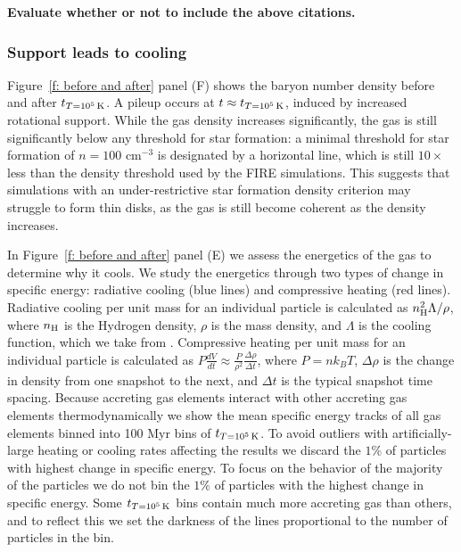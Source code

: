 \documentclass[fleqn,usenatbib]{mnras}
\newcommand{\tcon}{t_{T=10^5\,{\rm K}}}
\newcommand{\nH}{n_{\rm H}}
\begin{document}
\textbf{Evaluate whether or not to include the above citations.}

\subsubsection{Support leads to cooling}
\label{s: mechanics -- energy balance}

Figure~\ref{f: before and after} panel (F) shows the baryon number density before and after $\tcon$.
A pileup occurs at $t\approx \tcon$, induced by increased rotational support.
While the gas density increases significantly, the gas is still significantly below any threshold for star formation:
a minimal threshold for star formation of $n = 100$ cm$^{-3}$ is designated by a horizontal line, which is still $10\times$ less than the density threshold used by the FIRE simulations.
This suggests that simulations with an under-restrictive star formation density criterion may struggle to form thin disks, as the gas is still become coherent as the density increases.

In Figure~\ref{f: before and after} panel (E) we assess the energetics of the gas to determine why it cools.
We study the energetics through two types of change in specific energy: radiative cooling (blue lines) and compressive heating (red lines).
Radiative cooling per unit mass for an individual particle is calculated as $\nH^2 \Lambda / \rho$, where $\nH$ is the Hydrogen density, $\rho$ is the mass density, and $\Lambda$ is the cooling function, which we take from \cite{Wiersma2009a}.
Compressive heating per unit mass for an individual particle is calculated as $P \frac{dV}{dt} \approx \frac{ P }{ \rho^2 } \frac{ \Delta \rho }{ \Delta t }$, where $P = n k_B T$, $\Delta \rho$ is the change in density from one snapshot to the next, and $\Delta t$ is the typical snapshot time spacing.
Because accreting gas elements interact with other accreting gas elements thermodynamically we show the mean specific energy tracks of all gas elements binned into 100 Myr bins of $\tcon$.
To avoid outliers with artificially-large heating or cooling rates affecting the results we discard the $1\%$ of particles with highest change in specific energy.
To focus on the behavior of the majority of the particles we do not bin the $1\%$ of particles with the highest change in specific energy.
Some $\tcon$ bins contain much more accreting gas than others, and to reflect this we set the darkness of the lines proportional to the number of particles in the bin.
\end{document}
